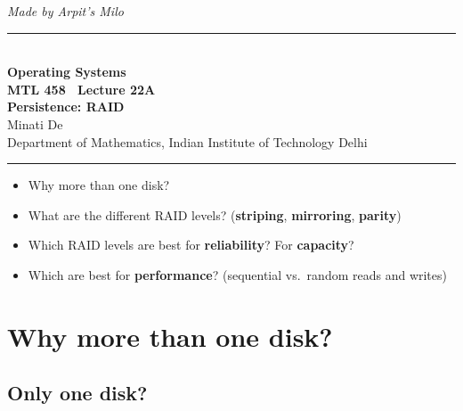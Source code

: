 \documentclass[11pt,a4paper]{article}
\begin{document}
\begin{center}
{\small\itshape Made by Arpit's Milo}\\[0.3em]
{\color{rulegray}\rule{\textwidth}{1.1pt}}\\[0.45em]
{\LARGE\bfseries Operating Systems}\\[0.25em]
{\Large\bfseries MTL 458 \textperiodcentered\ Lecture 22A}\\[0.35em]
{\LARGE\bfseries Persistence: RAID}\\[0.35em]
{\large Minati De}\\[0.15em]
{\normalsize Department of Mathematics, Indian Institute of Technology Delhi}\\[0.35em]
{\color{rulegray}\rule{\textwidth}{1.1pt}}
\end{center}

\vspace{0.4em}
\begin{keybox}
\begin{itemize}
  \item Why more than one disk?
  \item What are the different RAID levels? (\textbf{striping},
        \textbf{mirroring}, \textbf{parity})
  \item Which RAID levels are best for \textbf{reliability}? For
        \textbf{capacity}?
  \item Which are best for \textbf{performance}? (sequential vs.\ random
        reads and writes)
\end{itemize}
\end{keybox}

\tableofcontents
\vspace{0.6em}
\noindent{\color{rulegray}\rule{\textwidth}{0.4pt}}

\section{Why more than one disk?}

\subsection{Only one disk?}
\end{document}
